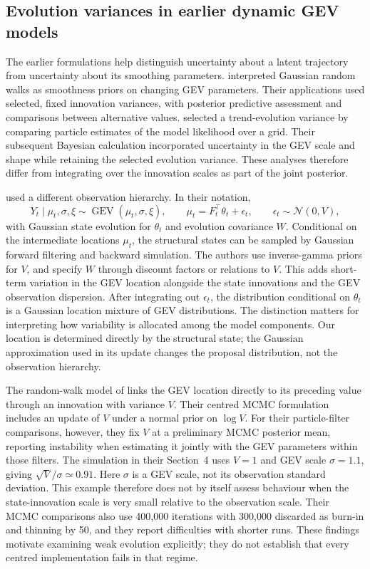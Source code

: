 \documentclass[11pt,a4paper]{article}
\newcommand{\N}{\mathcal N}
\newcommand{\GEV}{\operatorname{GEV}}
\begin{document}
	\subsection{Evolution variances in earlier dynamic GEV models}
	\label{supp:dynamic-gev-variances}
	
	The earlier formulations help distinguish uncertainty about a latent trajectory from uncertainty about its smoothing parameters. \citet{gaetan2004} interpreted Gaussian random walks as smoothness priors on changing GEV parameters. Their applications used selected, fixed innovation variances, with posterior predictive assessment and comparisons between alternative values. \citet[Section~5]{fearnhead2010} selected a trend-evolution variance by comparing particle estimates of the model likelihood over a grid. Their subsequent Bayesian calculation incorporated uncertainty in the GEV scale and shape while retaining the selected evolution variance. These analyses therefore differ from integrating over the innovation scales as part of the joint posterior.
	
	\citet{huerta2007} used a different observation hierarchy. In their notation,
	\[
	Y_t\mid\mu_t,\sigma,\xi\sim\GEV(\mu_t,\sigma,\xi),
	\qquad
	\mu_t=F_t^\top\theta_t+\epsilon_t,
	\qquad
	\epsilon_t\sim\N(0,V),
	\]
	with Gaussian state evolution for \(\theta_t\) and evolution covariance \(W\). Conditional on the intermediate locations \(\mu_t\), the structural states can be sampled by Gaussian forward filtering and backward simulation. The authors use inverse-gamma priors for \(V\), and specify \(W\) through discount factors or relations to \(V\). This adds short-term variation in the GEV location alongside the state innovations and the GEV observation dispersion. After integrating out \(\epsilon_t\), the distribution conditional on \(\theta_t\) is a Gaussian location mixture of GEV distributions. The distinction matters for interpreting how variability is allocated among the model components. Our location is determined directly by the structural state; the Gaussian approximation used in its update changes the proposal distribution, not the observation hierarchy.
	
	The random-walk model of \citet{wei2017} links the GEV location directly to its preceding value through an innovation with variance \(V\). Their centred MCMC formulation includes an update of \(V\) under a normal prior on \(\log V\). For their particle-filter comparisons, however, they fix \(V\) at a preliminary MCMC posterior mean, reporting instability when estimating it jointly with the GEV parameters within those filters. The simulation in their Section~4 uses \(V=1\) and GEV scale \(\sigma=1.1\), giving \(\sqrt V/\sigma\simeq0.91\). Here \(\sigma\) is a GEV scale, not its observation standard deviation. This example therefore does not by itself assess behaviour when the state-innovation scale is very small relative to the observation scale. Their MCMC comparisons also use 400,000 iterations with 300,000 discarded as burn-in and thinning by 50, and they report difficulties with shorter runs. These findings motivate examining weak evolution explicitly; they do not establish that every centred implementation fails in that regime.
	
\end{document}

